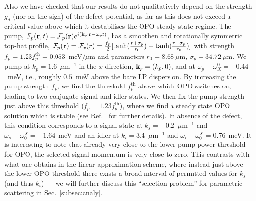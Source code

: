 \begin{subappendices}
Also we have checked that our results do not qualitatively depend on
the strength $g_d$ (nor on the sign) of the defect potential, as far
as this does not exceed a critical value above which it destabilises
the OPO steady-state regime.
%
The pump, $F_p(\mathbf{r},t) = \mathcal{F}_p(\mathbf{r}) e^{i (\mathbf{k}_p
  \cdot \mathbf{r} - \omega_p t)}$, has a smoothen and rotationally
symmetric top-hat profile, $\mathcal{F}_p(\mathbf{r}) = \mathcal{F}_p(r)
= \frac{f_p}{2}[\tanh(\frac{r+\sigma_p}{r_0}) -
  \tanh(\frac{r-\sigma_p}{r_0})]$ with strength $f_p = 1.23
f_p^\text{th} = 0.053$~meV/$\mu$m and parameters $r_0 = 8.68~\mu$m,
$\sigma_p = 34.72~\mu$m.
%
We pump at $k_p=1.6$~$\mu$m$^{-1}$ in the $x$-direction, $\mathbf{k}_p =
(k_p,0)$, and at $\omega_p-\omega_X^0=-0.44$~meV, i.e., roughly
$0.5$~meV above the bare LP dispersion. By increasing the pump
strength $f_p$, we find the threshold $f_p^{\text{th}}$ above which
OPO switches on, leading to two conjugate signal and idler states.
%
We then fix the pump strength just above this threshold ($f_p=1.23
f_p^{\text{th}}$), where we find a steady state OPO solution which is
stable (see Ref.~\cite{9783642241857} for further details). In
absence of the defect, this condition corresponds to a signal state at
$k_s=-0.2$~$\mu$m$^{-1}$ and $\omega_s-\omega_0^X = -1.64$~meV and an
idler at $k_i=3.4$~$\mu$m$^{-1}$ and $\omega_i-\omega_0^X =
0.76$~meV. 
%
It is interesting to note that already very close to the lower pump
power threshold for OPO, the selected signal momentum is very close to
zero. This contrasts with what one obtains in the linear approximation
scheme, where instead just above the lower OPO threshold there exists
a broad interval of permitted values for $k_s$ (and thus $k_i$) --- we
will further discuss this ``selection problem'' for parametric
scattering in Sec.~\ref{subsec:analy}.


\end{subappendices}
